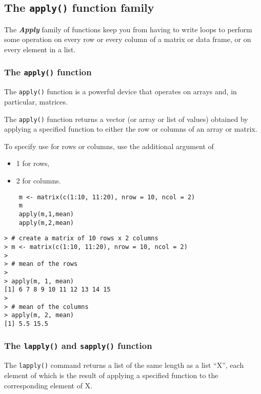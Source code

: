 \documentclass[12pt]{article}
\begin{document}
\newpage
\subsection*{The \texttt{apply()} function family}

The \textbf{\textit{Apply}} family of functions keep you from having to write loops to perform some operation on every row or every column of a matrix or data frame, or on every element in a list.
\subsubsection*{The \texttt{apply()} function}
The \texttt{apply()} function is a powerful device that operates on arrays and, in particular, matrices.

The  \texttt{apply()} function returns a vector (or array or list of values) obtained by applying a specified function to either the row or columns of an array or matrix.

To specify use for rows or columns, use the additional argument of \begin{itemize}
	\item 1 for rows, \item 2 for columns.
\end{itemize}

\begin{framed}
	\begin{verbatim}
	m <- matrix(c(1:10, 11:20), nrow = 10, ncol = 2)
	m
	apply(m,1,mean)
	apply(m,2,mean)
	\end{verbatim}
\end{framed}

\begin{verbatim}
> # create a matrix of 10 rows x 2 columns
> m <- matrix(c(1:10, 11:20), nrow = 10, ncol = 2)
>
> # mean of the rows
>
> apply(m, 1, mean)
[1] 6 7 8 9 10 11 12 13 14 15
>
> # mean of the columns
> apply(m, 2, mean)
[1] 5.5 15.5
\end{verbatim}

\subsubsection*{The \texttt{lapply()} and \texttt{sapply()} function}
The \texttt{lapply()} command returns a list of the same length as a list “X”, each element of which is the result of applying a specified function to the corresponding element of X.
\end{document}

